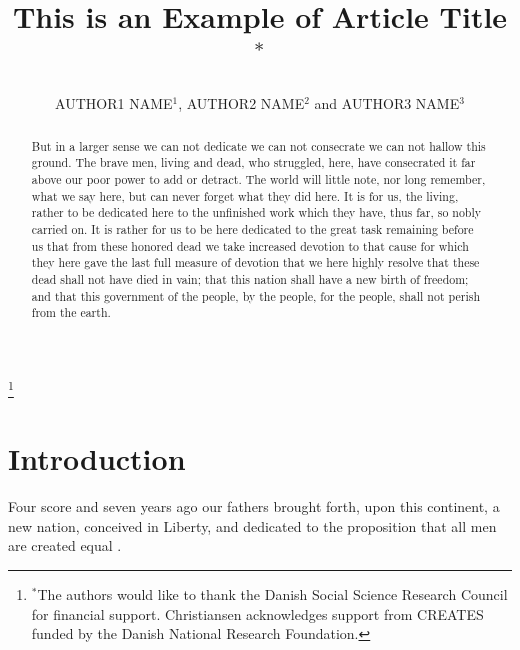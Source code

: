 \documentclass{roffin}
\begin{document}


\title{This is an Example of Article Title$^*$}

\author{AUTHOR1 NAME$^1$, AUTHOR2 NAME$^2$
and AUTHOR3 NAME$^3$}

\thanks{$^*$The authors would like to thank the Danish Social Science Research Council for financial
support. Christiansen acknowledges support from CREATES funded by the Danish National
Research Foundation.}

\maketitle

\begin{abstract}
But in a larger sense we can not dedicate we can not consecrate we can not hallow this ground. The brave men, living and dead,
who struggled, here, have consecrated it far above our poor power to add or detract. The world will little note, nor long remember,
what we say here, but can never forget what they did here. It is for us, the living, rather to be dedicated here to the unfinished work
which they have, thus far, so nobly carried on. It is rather for us to be here dedicated to the great task remaining before us that
from these honored dead we take increased devotion to that cause for which they here gave the last full measure of devotion that
we here highly resolve that these dead shall not have died in vain; that this nation shall have a new birth of freedom; and that this
government of the people, by the people, for the people, shall not perish from the earth.
\end{abstract}



\section{Introduction}

Four score and seven years ago our fathers brought forth,
upon this continent, a new nation, conceived in Liberty, and dedicated to
the proposition that all men are created equal \cite{Anderberg83}.
\end{document}
